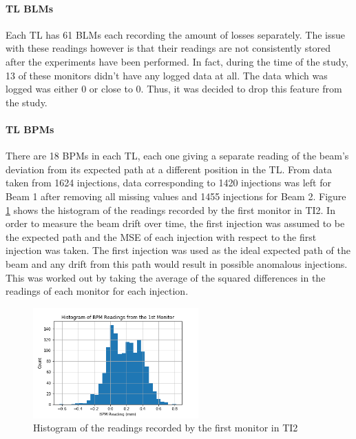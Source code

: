 \documentclass[conference, a4paper]{IEEEtran}
\begin{document}
	\paragraph{TL BLMs}Each TL has 61 BLMs each recording the amount of losses separately. The issue with these readings however is that their readings are not consistently stored after the experiments have been performed. In fact, during the time of the study, 13 of these monitors didn't have any logged data at all. The data which was logged was either 0 or close to 0. Thus, it was decided to drop this feature from the study.   
	
	\paragraph{TL BPMs}There are 18 BPMs in each TL, each one giving a separate reading of the beam's deviation from its expected path at a different position in the TL. From data taken from 1624 injections, data corresponding to 1420 injections was left for Beam 1 after removing all missing values and 1455 injections for Beam 2. Figure \ref{fig::BPM_hist} shows the histogram of the readings recorded by the first monitor in TI2. In order to measure the beam drift over time, the first injection was assumed to be the expected path and the MSE of each injection with respect to the first injection was taken. The first injection was used as the ideal expected path of the beam and any drift from this path would result in possible anomalous injections. This was worked out by taking the average of the squared differences in the readings of each monitor for each injection.
	
	\begin{figure}[!t]
		\centering
		\includegraphics[width=2.5in]{Histogram_of_BPM}
		\caption[BPM Histogram]{Histogram of the readings recorded by the first monitor in TI2}
		\label{fig::BPM_hist}
	\end{figure} 
\end{document}
